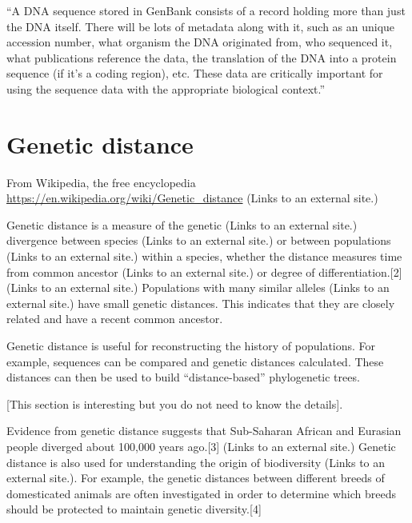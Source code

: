\documentclass[
]{book}
\begin{document}
``A DNA sequence stored in GenBank consists of a record holding more than just the DNA itself. There will be lots of metadata along with it, such as an unique accession number, what organism the DNA originated from, who sequenced it, what publications reference the data, the translation of the DNA into a protein sequence (if it's a coding region), etc. These data are critically important for using the sequence data with the appropriate biological context.''

\hypertarget{genetic-distance}{%
\section{Genetic distance}\label{genetic-distance}}

From Wikipedia, the free encyclopedia
\url{https://en.wikipedia.org/wiki/Genetic_distance} (Links to an external site.)

Genetic distance is a measure of the genetic (Links to an external site.) divergence between species (Links to an external site.) or between populations (Links to an external site.) within a species, whether the distance measures time from common ancestor (Links to an external site.) or degree of differentiation.{[}2{]} (Links to an external site.) Populations with many similar alleles (Links to an external site.) have small genetic distances. This indicates that they are closely related and have a recent common ancestor.

Genetic distance is useful for reconstructing the history of populations. For example, sequences can be compared and genetic distances calculated. These distances can then be used to build ``distance-based'' phylogenetic trees.

{[}This section is interesting but you do not need to know the details{]}.

Evidence from genetic distance suggests that Sub-Saharan African and Eurasian people diverged about 100,000 years ago.{[}3{]} (Links to an external site.) Genetic distance is also used for understanding the origin of biodiversity (Links to an external site.). For example, the genetic distances between different breeds of domesticated animals are often investigated in order to determine which breeds should be protected to maintain genetic diversity.{[}4{]}
\end{document}
